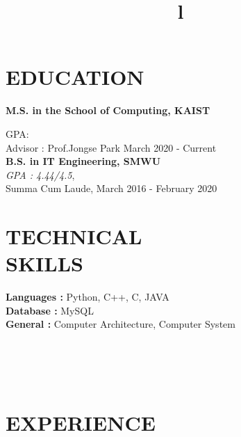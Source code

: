 \documentclass[margin]{res}
\begin{document}
\begin{resume}



\section{EDUCATION}
\textbf{M.S. in the School of Computing, KAIST}\\
{GPA:\\
Advisor : Prof.Jongse Park
\hfill March 2020 - Current\\

\textbf{B.S. in IT Engineering, SMWU} \\
{\sl GPA : 4.44/4.5},\\
Summa Cum Laude,
\hfill March 2016 - February 2020





\section{TECHNICAL\\SKILLS}

\textbf{Languages : } Python, C++, C, JAVA
\\
\textbf{Database :} MySQL
\\
\textbf{General : } Computer Architecture, Computer System

\begin{format}
\title{l}\\
\\
\body\\
\end{format}

\section{EXPERIENCE}
\section{}

}
\end{resume}
\end{document}
